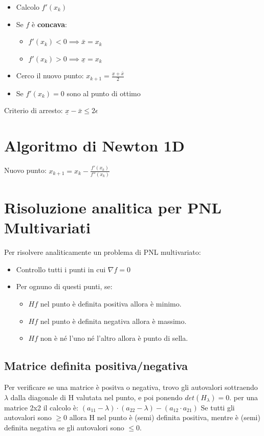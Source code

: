 \documentclass[12pt, a4paper, openany]{book}
\begin{document}
\begin{itemize}
	\item Calcolo $f'(x_k)$
	\item Se $f$ è \textbf{concava}:
	\begin{itemize}
		\item $f'(x_k) < 0 \implies \bar{x} = x_k$
		\item $f'(x_k) > 0 \implies \underline{x} = x_k$
	\end{itemize}
	\item Cerco il nuovo punto: $x_{k+1} = \frac{\underline{x} + \bar{x}}{2}$
	\item Se $f'(x_k) = 0$ sono al punto di ottimo
\end{itemize}
Criterio di arresto: $\underline{x} - \bar{x} \leq 2\epsilon$

\section{Algoritmo di Newton 1D}
Nuovo punto: $x_{k+1}=x_k- \frac{f'(x_k)}{f''(x_k)}$

\section{Risoluzione analitica per PNL Multivariati}
Per risolvere analiticamente un problema di PNL multivariato:
\begin{itemize}
	\item Controllo tutti i punti in cui $\nabla f = 0$
	\item Per ognuno di questi punti, se:
	\begin{itemize}
		\item $Hf$ nel punto è definita positiva allora è minimo.
		\item $Hf$ nel punto è definita negativa allora è massimo.
		\item $Hf$ non è né l'uno né l'altro allora è punto di sella.
	\end{itemize}
\end{itemize}

\subsection{Matrice definita positiva/negativa}
Per verificare se una matrice è positva o negativa, trovo gli autovalori sottraendo $\lambda$ dalla diagonale di H valutata nel punto, e poi ponendo $det(H_\lambda) = 0$.
per una matrice 2x2 il calcolo è: $(a_{11}-\lambda)\cdot(a_{22} - \lambda) - (a_{12} \cdot a_{21})$
Se tutti gli autovalori sono $\geq 0$ allora H nel punto è (semi) definita positiva, mentre è (semi) definita negativa se gli autovalori sono $\leq 0$.
\end{document}
